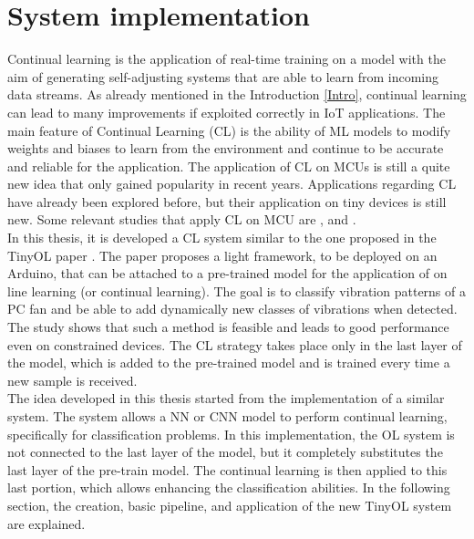 \documentclass[12pt]{report}
\begin{document}
\chapter{System implementation}
Continual learning is the application of real-time training on a model with the aim of generating self-adjusting systems that are able to learn from incoming data streams. As already mentioned in the Introduction \ref{Intro}, continual learning can lead to many improvements if exploited correctly in IoT applications. The main feature of Continual Learning (CL) is the ability of ML models to modify weights and biases to learn from the environment and continue to be accurate and reliable for the application. The application of CL on MCUs is still a quite new idea that only gained popularity in recent years. Applications regarding CL have already been explored before, but their application on tiny devices is still new. Some relevant studies that apply CL on MCU are \cite{ren2021tinyol}, \cite{ren2021synergy} and \cite{sudharsan2021train++}. \\
In this thesis, it is developed a CL system similar to the one proposed in the TinyOL paper \cite{ren2021tinyol}. The paper proposes a light framework, to be deployed on an Arduino, that can be attached to a pre-trained model for the application of on line learning (or continual learning). The goal is to classify vibration patterns of a PC fan and be able to add dynamically new classes of vibrations when detected. The study shows that such a method is feasible and leads to good performance even on constrained devices. The CL strategy takes place only in the last layer of the model, which is added to the pre-trained model and is trained every time a new sample is received.\\
The idea developed in this thesis started from the implementation of a similar system. The system allows a NN or CNN model to perform continual learning, specifically for classification problems. In this implementation, the OL system is not connected to the last layer of the model, but it completely substitutes the last layer of the pre-train model. The continual learning is then applied to this last portion, which allows enhancing the classification abilities. In the following section, the creation, basic pipeline, and application of the new TinyOL system are explained. 
\end{document}
